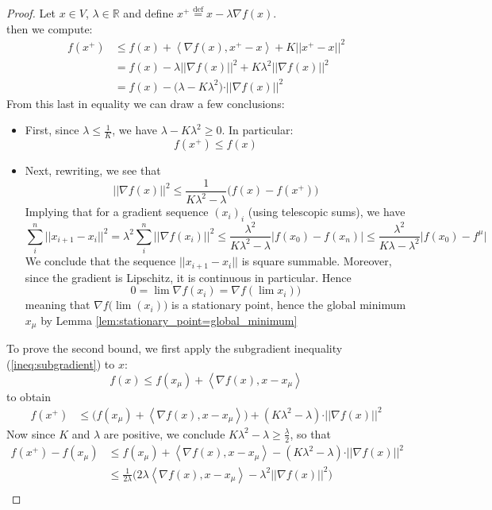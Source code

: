 \documentclass{book}
\theoremstyle{plain}
\theoremstyle{definition}
\newcommand{\bl}[2]{\left\langle #1,#2\right\rangle}
\renewcommand{\d}[1]{\mathbb{#1}}
\newcommand{\define}{\stackrel{\operatorname{def}}{=}}
\newcommand{\norm}[1]{\vert \vert #1 \vert \vert}
\begin{document}
\begin{proof}
Let $x \in V$, $\lambda \in \d{R}$ and define $x^+\define x-\lambda \nabla f(x)$.\\
\noindent then we compute:
\begin{align*}
	f(x^+)& \le f(x)+\bl{\nabla f(x)}{x^+-x}+K\vert \vert x^+-x\vert \vert^2\\
	& = f(x)-\lambda \vert \vert \nabla f(x)\vert \vert^2 +K\lambda^2\vert \vert \nabla f(x)\vert \vert^2\\
	&= f(x)-\big(\lambda- K\lambda^2\big)\cdot \vert \vert \nabla f(x)\vert \vert^2
\end{align*}
From this last in equality we can draw a few conclusions:
\begin{itemize}
\item	First, since $\lambda \le \frac{1}{K}$, we have $\lambda-K\lambda^2\ge 0$. In particular: 
\[f(x^+)\le f(x)\]
\item Next, rewriting, we see that
\[
\norm{\nabla f(x)}^2\le \frac{1}{K\lambda^2-\lambda}\bigg(f(x)-f(x^+)\bigg)
\]
Implying that for a gradient sequence $(x_i)_i$ (using telescopic sums), we have
\[
\sum_i^n \norm{x_{i+1}-x_i}^2 =\lambda^2 \sum_i^n \norm{\nabla f(x_i)}^2\le \frac{\lambda^2}{K\lambda^2-\lambda}\vert f(x_0)-f(x_n)\vert\le \frac{\lambda^2}{K\lambda-\lambda^2}\vert f(x_0)-f^\mu \vert  
\]
We conclude that the sequence $\norm{x_{i+1}-x_i}$ is square summable. Moreover, since the gradient is Lipschitz, it is continuous in particular. Hence
\[
0=\lim \nabla f(x_i)=\nabla f (\lim x_i))
\]
meaning that $\nabla f\big( \lim(x_i)\big)$ is a stationary point, hence the global minimum  $x_\mu$ by Lemma \ref{lem:stationary_point=global_minimum}
\end{itemize}
\noindent To prove the second bound, we first apply the subgradient inequality (\ref{ineq:subgradient}) to $x$: \[f(x)\le f(x_\mu)+\bl{\nabla f(x)}{x-x_\mu}\] to obtain
\begin{align*}
f(x^+)&\le \bigg( f(x_\mu)+\bl{\nabla f(x)}{x-x_\mu}\bigg)+(K\lambda^2-\lambda)\cdot \vert \vert \nabla f(x)\vert \vert^2	
\end{align*}
Now since $K$ and $\lambda$ are positive, we conclude $K\lambda^2-\lambda \ge \frac{\lambda}{2}$, so that
\begin{align*}
f(x^+)-f(x_\mu)&\le  f(x_\mu)+\bl{\nabla f(x)}{x-x_\mu}-(K\lambda^2-\lambda)\cdot \vert \vert \nabla f(x)\vert \vert^2	\\ 
 & \le \frac{1}{2\lambda}\bigg(2\lambda \bl{\nabla f(x)}{x -x_\mu}-\lambda^2\vert \vert \nabla f(x)\vert \vert^2 \bigg)\\

\end{align*}
\end{proof}
\end{document}
